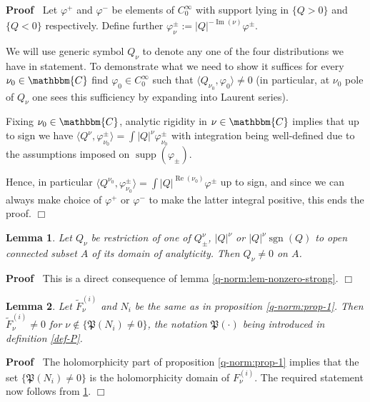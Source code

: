 \documentclass{article}
\newcommand{\assign}{:=}
\newcommand{\nin}{\not\in}
\newcommand{\tmop}[1]{\ensuremath{\operatorname{#1}}}
\newenvironment{proof}{\noindent\textbf{Proof\ }}{\hspace*{\fill}$\Box$\medskip}
\numberwithin{definition}{section}
\newtheorem{lemma}{Lemma}
\numberwithin{lemma}{section}
\numberwithin{proposition}{section}
{\theorembodyfont{\rmfamily}\newtheorem{remark}{Remark}
\numberwithin{remark}{section}
}
\begin{document}
\begin{proof}
  Let $\varphi_{}^+$ and $\varphi_{}^-$ be elements of $C_0^{\infty}$ with
  support lying in $\{ Q > 0 \}$ and $\{ Q < 0 \}$ respectively. Define
  further $\varphi^{\pm}_{\nu} \assign | Q |^{- \tmop{Im} ( \nu)}
  \varphi^{\pm}$.
  
  We will use generic symbol $Q_{\nu}$ to denote any one of the four
  distributions we have in statement. To demonstrate what we need to show it
  suffices for every $\nu_0 \in \mathbbm{C}$ find $\varphi_0 \in C^{\infty}_0$
  such that $\langle Q_{\nu_0}, \varphi_0 \rangle \neq 0$ (in particular, at
  $\nu_0$ pole of $Q_{\nu}$ one sees this sufficiency by expanding into
  Laurent series).
  
  Fixing $\nu_0 \in \mathbbm{C}$, analytic rigidity in $\nu \in \mathbbm{C}$
  implies that up to sign we have $\langle Q^{\nu}, \varphi^{\pm}_{\nu_0}
  \rangle = \int | Q |^{\nu} \varphi^{\pm}_{\nu_0}$ with integration being
  well-defined due to the assumptions imposed on $\tmop{supp} (
  \varphi_{\pm})$.
  
  Hence, in particular $\langle Q^{\nu_0}, \varphi_{\nu_0}^{\pm} \rangle =
  \int | Q |^{\tmop{Re} ( \nu_0)} \varphi_{}^{\pm}$ up to sign, and since we
  can always make choice of $\varphi^+$ or $\varphi^-$ to make the latter
  integral positive, this ends the proof.
\end{proof}

\begin{lemma}
  \label{lem-holo-nonzero}Let $Q_{\nu}$ be restriction of one of
  $Q_{\pm}^{\nu}$, $| Q |^{\nu}$ or $| Q |^{\nu} \tmop{sgn} ( Q)$ to open
  connected subset $A$ of its domain of analyticity. Then $Q_{\nu} \neq 0$ on
  $A$.
\end{lemma}

\begin{proof}
  This is a direct consequence of lemma \ref{q-norm:lem-nonzero-strong}.
\end{proof}

\begin{lemma}
  \label{lem-4}Let $\tilde{F}_{\nu}^{( i)}$ and $N_i$ be the same as in
  proposition \ref{q-norm:prop-1}. Then $\tilde{F}_{\nu}^{( i)} \neq 0$ for
  $\nu \nin \{ \mathfrak{P} ( N_i) \neq 0 \}$, the notation $\mathfrak{P} (
  \cdot)$ being introduced in definition \ref{def-P}.
\end{lemma}

\begin{proof}
  The holomorphicity part of proposition \ref{q-norm:prop-1} implies that the
  set $\{ \mathfrak{P} ( N_i) \neq 0 \}$ is the holomorphicity domain of
  $F_{\nu}^{( i)}$. The required statement now follows from
  \ref{lem-holo-nonzero}.
\end{proof}
\end{document}
